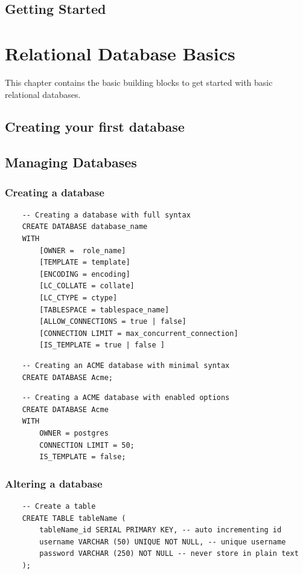 \section{Getting Started}


\chapter{Relational Database Basics}
\label{chap:relational:relational-database-basics}
This chapter contains the basic building blocks to get started with basic relational databases.

\section{Creating your first database}

\section{Managing Databases}

\subsection{Creating a database}
\begin{verbatim}
    -- Creating a database with full syntax
    CREATE DATABASE database_name
    WITH
        [OWNER =  role_name]
        [TEMPLATE = template]
        [ENCODING = encoding]
        [LC_COLLATE = collate]
        [LC_CTYPE = ctype]
        [TABLESPACE = tablespace_name]
        [ALLOW_CONNECTIONS = true | false]
        [CONNECTION LIMIT = max_concurrent_connection]
        [IS_TEMPLATE = true | false ]
\end{verbatim}

\begin{verbatim}
    -- Creating an ACME database with minimal syntax
    CREATE DATABASE Acme;
\end{verbatim}

\begin{verbatim}
    -- Creating a ACME database with enabled options
    CREATE DATABASE Acme 
    WITH
        OWNER = postgres
        CONNECTION LIMIT = 50;
        IS_TEMPLATE = false;
\end{verbatim}

\subsection{Altering a database}
\begin{verbatim}
    -- Create a table
    CREATE TABLE tableName (
        tableName_id SERIAL PRIMARY KEY, -- auto incrementing id
        username VARCHAR (50) UNIQUE NOT NULL, -- unique username
        password VARCHAR (250) NOT NULL -- never store in plain text
    );
\end{verbatim}

